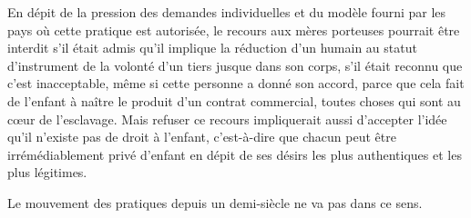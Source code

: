  En dépit de la pression des demandes individuelles et du modèle fourni par les pays où cette pratique est autorisée, le recours aux mères porteuses pourrait être interdit s'il était admis qu'il implique la réduction d'un humain au statut d'instrument de la volonté d'un tiers jusque dans son corps, s'il était reconnu que c'est inacceptable, même si cette personne a donné son accord, parce que cela fait de l'enfant à naître le produit d'un contrat commercial, toutes choses qui sont au cœur de l'esclavage. Mais refuser ce recours impliquerait aussi d'accepter l'idée qu'il n'existe pas de droit à l'enfant, c'est-à-dire que chacun peut être irrémédiablement privé d'enfant en dépit de ses désirs les plus authentiques et les plus légitimes. 

 Le mouvement des pratiques depuis un demi-siècle ne va pas dans ce sens.
 
 
